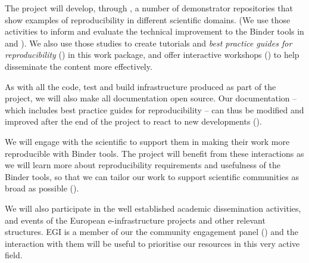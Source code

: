 \begin{workpackage}
\begin{wpdescription}

  The \TheProject project will develop, through , a number
  of demonstrator repositories that show examples of reproducibility in
  different scientific domains. (We use
  those activities to inform and evaluate the technical improvement to the
  Binder tools in  and ). We also use those
  studies to create tutorials and \emph{best practice guides for
    reproducibility} () in this work package, and
  offer interactive workshops () to help disseminate the
  content more effectively.

  As with all the code, test and build infrastructure produced as part of the
  project, we will also make all documentation open source. Our documentation --
  which includes best practice guides for reproducibility -- can thus be
  modified and improved after the end of the project to react to new
  developments ().

  We will engage with the scientific to support them in making their
  work more reproducible with Binder tools. The project will benefit from these interactions
  as we will learn more about reproducibility requirements and usefulness of the
  Binder tools, so that we can tailor our work to support scientific communities as broad as possible
  ().

  We will also participate in the well established academic dissemination
  activities, and events of the European e-infrastructure projects and other
  relevant structures. EGI is a member of our the community engagement panel
  () and the interaction with
  them will be useful to prioritise our resources in this very active field.


\end{wpdescription}
\end{workpackage}
